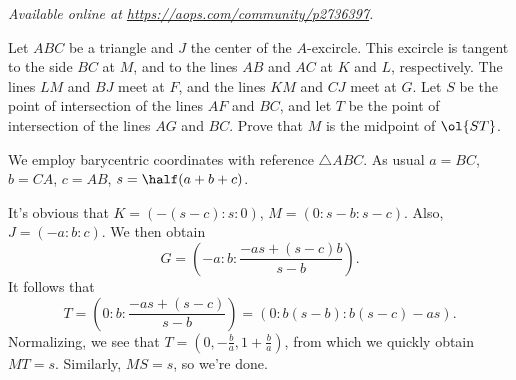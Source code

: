 \textsl{Available online at \url{https://aops.com/community/p2736397}.}
\begin{mdframed}[style=mdpurplebox,frametitle={Problem statement}]
Let $ABC$ be a triangle and $J$ the center of the $A$-excircle.
This excircle is tangent to the side $BC$ at $M$,
and to the lines $AB$ and $AC$ at $K$ and $L$, respectively.
The lines $LM$ and $BJ$ meet at $F$, and the lines $KM$ and $CJ$ meet at $G$.
Let $S$ be the point of intersection of the lines $AF$ and $BC$,
and let $T$ be the point of intersection of the lines $AG$ and $BC$.
Prove that $M$ is the midpoint of $\ol{ST}$.
\end{mdframed}
We employ barycentric coordinates with reference $\triangle ABC$.
As usual $a = BC$, $b = CA$, $c = AB$, $s = \half(a+b+c)$.

It's obvious that $K = ( -(s-c): s : 0)$, $M = ( 0 : s-b : s-c)$.
Also, $J = (-a : b : c)$.
We then obtain
\[ G = \left( -a: b : \frac{-as + (s-c)b}{s-b} \right). \]
It follows that
\[ T = \left( 0 : b : \frac{-as + (s-c)}{s-b} \right) = ( 0 : b(s-b) : b(s-c) - as). \]
Normalizing, we see that $T = \left( 0, -\frac{b}{a}, 1 + \frac{b}{a} \right)$,
from which we quickly obtain $MT = s$.
Similarly, $MS = s$, so we're done.
\pagebreak